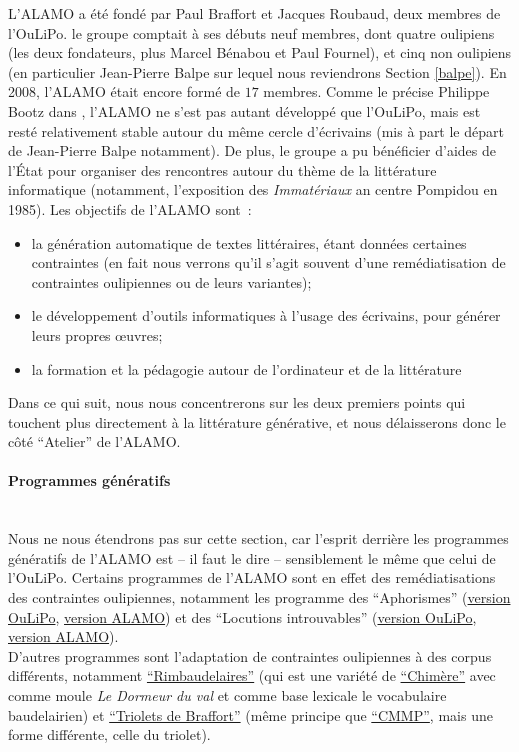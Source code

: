 \documentclass{article}
\newcommand{\subsubsubsection}[1]{\paragraph{#1}\mbox{}\\}
\begin{document}
				L'ALAMO a été fondé par Paul Braffort et Jacques Roubaud, deux membres de l'OuLiPo. le groupe comptait à ses débuts neuf membres, dont quatre oulipiens (les deux fondateurs, plus Marcel Bénabou et Paul Fournel), et cinq non oulipiens (en particulier Jean-Pierre Balpe sur lequel nous reviendrons Section \ref{balpe}). En 2008, l'ALAMO était encore formé de $17$ membres. Comme le précise Philippe Bootz dans \cite{bootz2012}, l'ALAMO ne s'est pas autant développé que l'OuLiPo, mais est resté relativement stable autour du même cercle d'écrivains (mis à part le départ de Jean-Pierre Balpe notamment). De plus, le groupe a pu bénéficier d'aides de l'État pour organiser des rencontres autour du thème de la littérature informatique (notamment, l'exposition des \textit{Immatériaux} an centre Pompidou en 1985). Les objectifs de l'ALAMO \cite{alamo} sont~:
				\vspace{2mm}
				\begin{itemize}
					\item la génération automatique de textes littéraires, étant données certaines contraintes (en fait nous verrons qu'il s'agit souvent d'une remédiatisation de contraintes oulipiennes ou de leurs variantes);
					\item le développement d'outils informatiques à l'usage des écrivains, pour générer leurs propres œuvres;
					\item la formation et la pédagogie autour de l'ordinateur et de la littérature
				\end{itemize}
				\vspace{2mm}
				Dans ce qui suit, nous nous concentrerons sur les deux premiers points qui touchent plus directement à la littérature générative, et nous délaisserons donc le côté ``Atelier'' de l'ALAMO.
				\subsubsubsection{Programmes génératifs}
					Nous ne nous étendrons pas sur cette section, car l'esprit derrière les programmes génératifs de l'ALAMO est -- il faut le dire -- sensiblement le même que celui de l'OuLiPo. Certains programmes de l'ALAMO sont en effet des remédiatisations des contraintes oulipiennes, notamment les programme des ``Aphorismes'' (\href{http://oulipo.net/fr/contraintes/aphorisme}{version OuLiPo}, \href{http://www.alamo.free.fr/pmwiki.php?n=Programmes.Aphorismes}{version ALAMO}) et des ``Locutions introuvables'' (\href{http://oulipo.net/fr/contraintes/locutions-introuvables}{version OuLiPo}, \href{http://www.alamo.free.fr/pmwiki.php?n=Programmes.LocutionsIntrouvables}{version ALAMO}).\\
					D'autres programmes sont l'adaptation de contraintes oulipiennes à des corpus différents, notamment \href{http://www.alamo.free.fr/pmwiki.php?n=Programmes.Rimbaudelaires}{``Rimbaudelaires''} (qui est une variété de \href{http://oulipo.net/fr/contraintes/chimere}{``Chimère''} avec comme moule \textit{Le Dormeur du val} et comme base lexicale le vocabulaire baudelairien) et \href{http://www.alamo.free.fr/pmwiki.php?n=Programmes.Triolets}{``Triolets de Braffort''} (même principe que \href{http://oulipo.net/fr/contraintes/cmmp}{``CMMP''}, mais une forme différente, celle du triolet).\\
\end{document}
